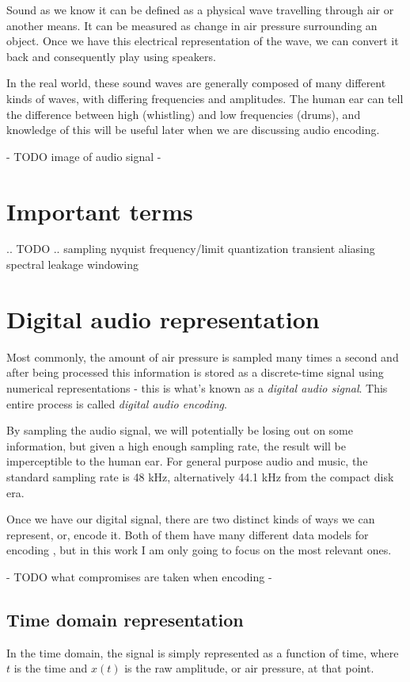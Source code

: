 Sound as we know it can be defined as a physical wave travelling through air or another means. \cite{you_2010} It can be measured as change in air pressure surrounding an object. Once we have this electrical representation of the wave, we can convert it back and consequently play using speakers.

In the real world, these sound waves are generally composed of many different kinds of waves, with differing frequencies and amplitudes. The human ear can tell the difference between high (whistling) and low frequencies (drums), and knowledge of this will be useful later when we are discussing audio encoding.

- TODO image of audio signal -

\section{Important terms}
.. TODO ..
sampling
nyquist frequency/limit
quantization
transient
aliasing
spectral leakage
windowing

\section{Digital audio representation}
Most commonly, the amount of air pressure is sampled many times a second and after being processed this information is stored as a discrete-time signal using numerical representations - this is what's known as a \emph{digital audio signal}. This entire process is called \emph{digital audio encoding}.

By sampling the audio signal, we will potentially be losing out on some information, but given a high enough sampling rate, the result will be imperceptible to the human ear. For general purpose audio and music, the standard sampling rate is 48 kHz, alternatively 44.1 kHz from the compact disk era.

Once we have our digital signal, there are two distinct kinds of ways we can represent, or, encode it. Both of them have many different data models for encoding \cite{you_2010}, but in this work I am only going to focus on the most relevant ones.

- TODO what compromises are taken when encoding -

\subsection{Time domain representation}
In the time domain, the signal is simply represented as a function of time, where $t$ is the time and $x(t)$ is the raw amplitude, or air pressure, at that point. \cite{bosi_goldberg_2003}

